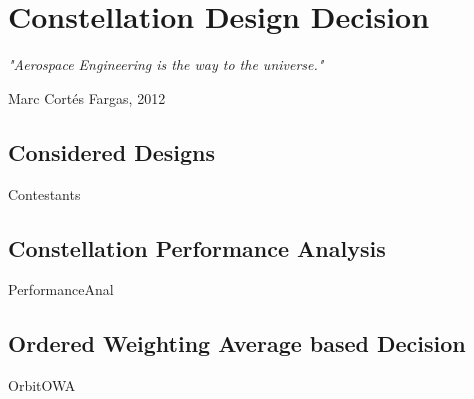 \chapter{Constellation Design Decision}

\epigraph{\textit{"Aerospace Engineering is the way to the universe."}}{Marc Cortés Fargas, 2012} 

\section{Considered Designs}
{Contestants}

\section{Constellation Performance Analysis}
{PerformanceAnal}

\section{Ordered Weighting Average based Decision}
{OrbitOWA}
